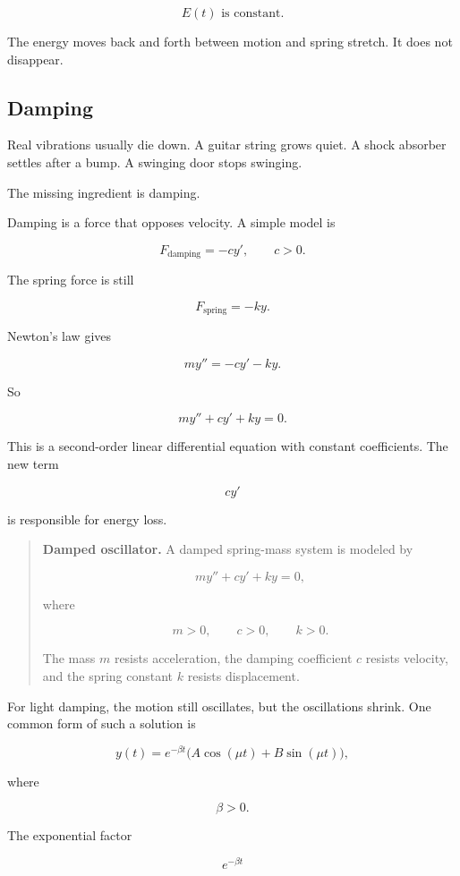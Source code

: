 \[
\boxed{
E(t)\text{ is constant.}
}
\]

The energy moves back and forth between motion and spring stretch.  It does not
disappear.

\subsection{Damping}
\label{subsec:damping}

Real vibrations usually die down.  A guitar string grows quiet.  A shock absorber settles
after a bump.  A swinging door stops swinging.

The missing ingredient is damping.

Damping is a force that opposes velocity.  A simple model is

\[
F_{\text{damping}}=-c y',
\qquad c>0.
\]

The spring force is still

\[
F_{\text{spring}}=-ky.
\]

Newton's law gives

\[
my''=-cy'-ky.
\]

So

\[
\boxed{
my''+cy'+ky=0.
}
\]

This is a second-order linear differential equation with constant coefficients.  The new
term

\[
cy'
\]

is responsible for energy loss.

\begin{quote}
\textbf{Damped oscillator.}
A damped spring-mass system is modeled by

\[
\boxed{
my''+cy'+ky=0,
}
\]

where

\[
m>0,\qquad c>0,\qquad k>0.
\]

The mass \(m\) resists acceleration, the damping coefficient \(c\) resists velocity, and
the spring constant \(k\) resists displacement.
\end{quote}

For light damping, the motion still oscillates, but the oscillations shrink.  One common
form of such a solution is

\[
y(t)=e^{-\beta t}\bigl(A\cos(\mu t)+B\sin(\mu t)\bigr),
\]

where

\[
\beta>0.
\]

The exponential factor

\[
e^{-\beta t}
\]

